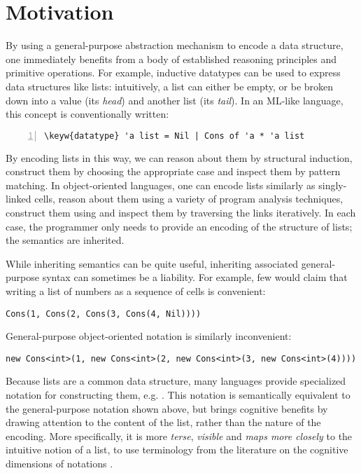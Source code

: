 \section{Motivation}
\label{s:intro}
By using a general-purpose abstraction mechanism to encode a data structure, one immediately benefits from a body of established reasoning principles and primitive operations. For example, inductive datatypes can be used to express data structures like lists: intuitively, a list can either be empty, or be broken down into a value (its \emph{head}) and another list (its \emph{tail}). In an ML-like language, this concept is conventionally written:
\begin{Verbatim}[commandchars=\\\{\},numbers=left,formatcom=\fontsize{8pt}{1em}\selectfont]
  \keyw{datatype} 'a list = Nil | Cons of 'a * 'a list
\end{Verbatim}
By encoding lists in this way, we can reason about them by structural induction, construct them by choosing the appropriate case and inspect them by pattern matching. In object-oriented languages, one can encode lists similarly as singly-linked cells, reason about them using a variety of program analysis techniques, construct them using  and inspect them by traversing the links iteratively. In each case, the programmer only needs to provide an encoding of the structure of lists; the semantics are inherited.

While inheriting semantics can be quite useful, inheriting associated general-purpose syntax can sometimes be a liability. For example, few would claim that writing a list of numbers as a sequence of  cells is convenient:
\begin{lstlisting}
Cons(1, Cons(2, Cons(3, Cons(4, Nil))))
\end{lstlisting}
General-purpose object-oriented notation is similarly inconvenient:
\begin{lstlisting}
new Cons<int>(1, new Cons<int>(2, new Cons<int>(3, new Cons<int>(4))))
\end{lstlisting}
Because lists are a common data structure, many languages provide specialized notation for constructing them, e.g. \li{[1, 2, 3, 4]}. This notation is semantically equivalent to the general-purpose notation shown above, but brings cognitive benefits by drawing attention to the content of the list, rather than the nature of the encoding. More specifically, it is more \emph{terse}, \emph{visible} and \emph{maps more closely} to the intuitive notion of a list, to use terminology from the literature on the cognitive dimensions of notations \cite{green1996usability}.

